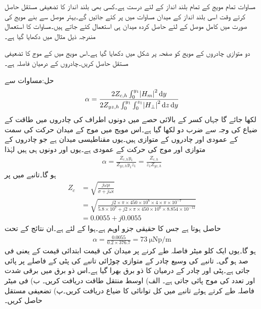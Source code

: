 مساوات  تمام مویج کے تمام بلند انداز کے لئے درست ہے۔کسی بھی بلند انداز کا تضعیفی مستقل حاصل کرتے وقت اسی بلند انداز کے میدان مساوات  میں پر کئے جائیں گے۔بہتر موصل سے بنے مویج کی صورت میں کامل موصل کے لئے حاصل کردہ میدان ہی استعمال کئے جاتے ہیں۔مساوات  کا استعمال مندرجہ ذیل مثال میں دکھایا گیا ہے۔

دو متوازی چادروں کے مویج کو صفحہ  پر شکل  میں دکھایا گیا ہے۔اس مویج میں  کے  موج کا تضعیفی مستقل حاصل کریں۔چادروں کے درمیان فاصلہ  ہے۔

حل:مساوات   سے
\begin{align*}
\alpha=\frac{2 Z_{c,h} \int_0^{y_1} \abs{H_m}^2 \dif y}{2 Z_{yz,h} \int_0^{y_1} \int_0^{z_1} \abs{H_{\perp}}^2 \dif z \dif y}
\end{align*}
لکھا جائے گا جہاں کسر کے بالائی حصے میں دونوں اطراف کی چادروں میں طاقت کے ضیاع کی وجہ سے ضرب دو لکھا گیا ہے۔اس مویج میں  موج کے میدان حرکت کی سمت کے عمودی اور چادروں کے متوازی ہیں۔یوں مقناطیسی میدان  ہے جو چادروں کے متوازی اور موج کی حرکت کے عمودی ہے۔یوں  اور  دونوں   ہی ہیں لہٰذا
 \begin{align*}
\alpha=\frac{Z_{c,h} y_1}{Z_{yz,h} y_1 z_1}=\frac{Z_{c,h}}{z_1 Z_{yz,h}}
\end{align*}
ہو گا۔تانبے میں  پر
\begin{align*}
Z_{c}&=\sqrt{\frac{j\omega \mu}{\sigma+j\omega \epsilon}}\\
&=\sqrt{\frac{j 2 \times \pi \times 450 \times 10^{6} \times 4 \times \pi \times 10^{-7}}{5.8\times 10^{7}+j 2\times \pi \times 450 \times 10^{6} \times 8.854 \times 10^{-12}}}\\
&=0.0055+j0.0055
\end{align*}
حاصل ہوتا ہے جس کا حقیقی جزو  اوہم ہے۔ہوا کے لئے  ہے۔ان نتائج کے تحت
 \begin{align*}
\alpha=\frac{0.0055}{0.2 \times  376.7}=\SI{73}{\micro\neper/\meter} 
\end{align*}
ہو گا۔یوں ایک کلو میٹر فاصلہ طے کرنے پر میدان کی قیمت ابتدائی قیمت کے  یعنی  فی صد ہو گی۔
تانبے کی وسیع چادر کے متوازی  چوڑائی تانبے کی پٹی  کے فاصلے پر پائی جاتی ہے۔پٹی اور چادر کے درمیان  کا ذو برق بھرا گیا ہے۔اس ذو برق میں  برقی شدت اور  تعدد کی  موج پائی جاتی ہے۔ الف) اوسط منتقل طاقت دریافت کریں۔ ب) فی میٹر فاصلہ طے کرتے ہوئے تانبے میں کل توانائی کا ضیاع دریافت کریں۔پ) تضعیفی مستقل حاصل کریں۔

